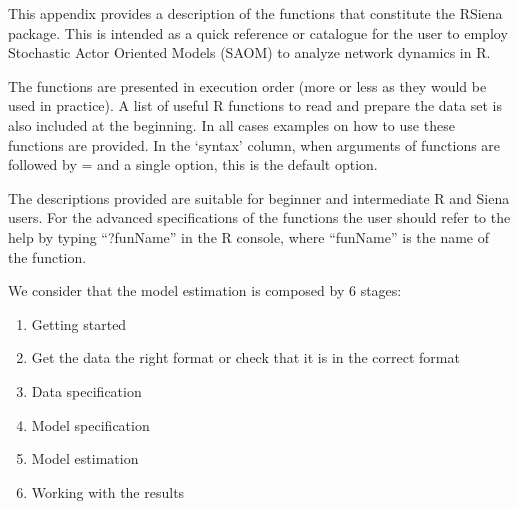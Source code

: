 \documentclass[a4paper,fleqn,11pt]{article}
\newcommand{\+}{\, + \,}
\newcommand{\R}{{\sf R }}
\newcommand{\Rn}{{\sf R}}
\newcommand{\RS}{{\sf RSiena }}
\begin{document}
    This appendix
    provides a description of the functions that constitute the
    \RS package. This is intended as a quick reference or catalogue for the
    user to employ Stochastic Actor Oriented Models (SAOM) to analyze network
    dynamics in \Rn.

    The functions are presented in execution order (more or less as
    they would be used in practice). A list of useful \R
    functions to read and prepare the data set is also included at the
    beginning. In all cases examples on how to use these functions are provided.
    In the `syntax' column,
    when arguments of functions are followed by = and a single option,
    this is the default option.

    The descriptions provided are suitable for beginner and intermediate \R and
    Siena users. For the advanced specifications of the functions the user
    should refer to the help by typing ``?funName'' in the \R console, where
    ``funName'' is the name of the function.

    We consider that the model estimation is composed by 6 stages:
\begin{enumerate}
    \item Getting started
    \item Get the data the right format or check that it is in the correct
      format
    \item Data specification
    \item Model specification
    \item   Model estimation
    \item   Working with the results
\end{enumerate}
\end{document}
